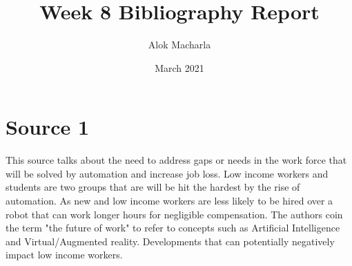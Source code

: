 \documentclass{article}
\title{Week 8 Bibliography Report}
\author{Alok Macharla}
\date{March 2021}
\begin{document}
\maketitle

\section{Source 1}
This source talks about the need to address gaps or needs in the work force that will be solved by automation and increase job loss. Low income workers and students are two groups that are will be hit the hardest by the rise of automation. As new and low income workers are less likely to be hired over a robot that can work longer hours for negligible compensation. The authors coin the term "the future of work" to refer to concepts such as Artificial Intelligence and Virtual/Augmented reality. Developments that can potentially negatively impact low income workers. \cite{ED59399720181115}



\end{document}

